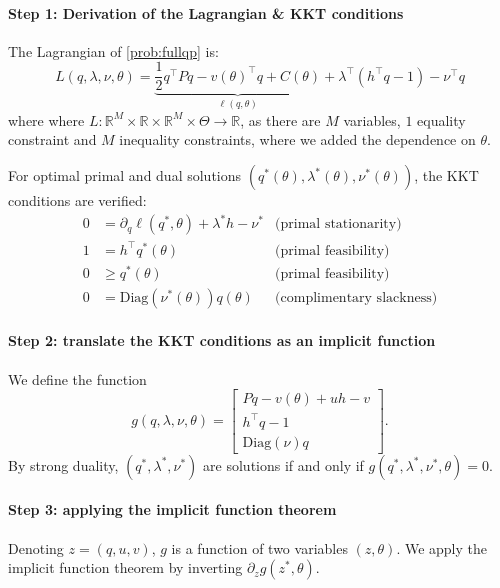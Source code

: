 \paragraph{Step 1: Derivation of the Lagrangian \& KKT conditions}
The Lagrangian of \cref{prob:fullqp} is:
\begin{equation}
    L(q, \lambda, \nu, \theta) = \underbrace{\frac{1}{2}q^\top Pq - v(\theta)^\top q + C(\theta)}_{\ell(q, \theta)}+ \lambda^\top (h^\top q - 1) - \nu^\top q
\end{equation}
where
where $L: \mathbb R^M \times \mathbb R \times \mathbb R^M\times\Theta\to\mathbb R$, as there are $M$ variables, $1$ equality constraint and $M$ inequality constraints, where we added the dependence on $\theta$.

For optimal primal and dual solutions $(q^*(\theta), \lambda^*(\theta), \nu^*(\theta))$, the KKT conditions are verified:
\begin{align}
    0 &= \partial_q \ell(q^*, \theta) + \lambda^*h - \nu^* &\text{(primal stationarity)}\\
    1 & =h^\top q^*(\theta)  & \text{(primal feasibility)} \\
    0 & \geq q^*(\theta) & \text{(primal feasibility)}\\
    0 & = \mathrm{Diag}(\nu^*(\theta))q(\theta) & \text{(complimentary slackness)}
\end{align}


\paragraph{Step 2: translate the KKT conditions as an implicit function}

We define the function
\begin{equation}
g(q, \lambda, \nu, \theta) = \begin{bmatrix}
    Pq - v(\theta) + uh - v\\
    h^\top q- 1\\
    \mathrm{Diag}(\nu)q
\end{bmatrix}.
\end{equation}
By strong duality, $(q^*, \lambda^*, \nu^*)$ are solutions if and only if $g(q^*, \lambda^*, \nu^*, \theta) = 0$.

\paragraph{Step 3: applying the implicit function theorem}
Denoting $z = (q, u, v)$, $g$ is a function of two variables $(z, \theta)$. We apply the implicit function theorem by inverting $\partial_z g(z^*, \theta)$.

